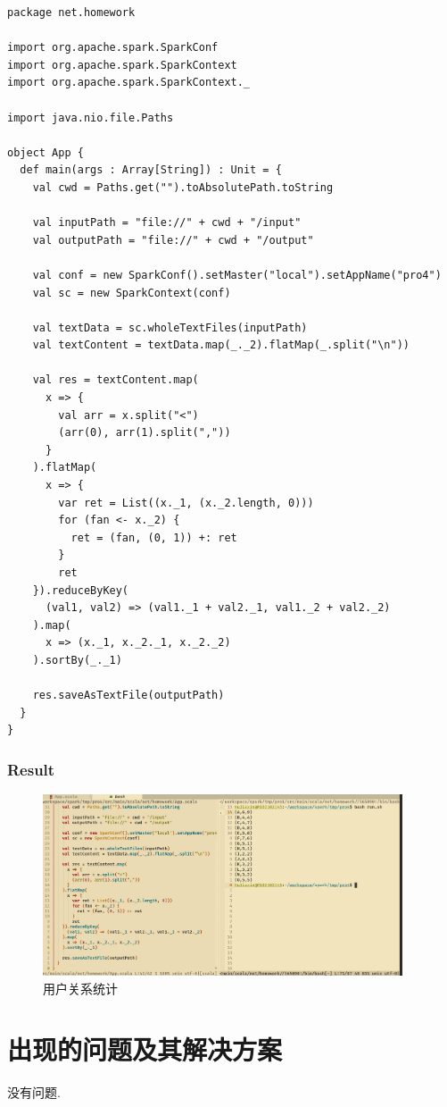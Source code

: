 \documentclass{article}
\begin{document}
\begin{center}
\begin{verbatim}
package net.homework

import org.apache.spark.SparkConf
import org.apache.spark.SparkContext
import org.apache.spark.SparkContext._

import java.nio.file.Paths

object App {
  def main(args : Array[String]) : Unit = {
    val cwd = Paths.get("").toAbsolutePath.toString

    val inputPath = "file://" + cwd + "/input"
    val outputPath = "file://" + cwd + "/output"

    val conf = new SparkConf().setMaster("local").setAppName("pro4")
    val sc = new SparkContext(conf)

    val textData = sc.wholeTextFiles(inputPath)
    val textContent = textData.map(_._2).flatMap(_.split("\n"))

    val res = textContent.map(
      x => {
        val arr = x.split("<")
        (arr(0), arr(1).split(","))
      }
    ).flatMap(
      x => {
        var ret = List((x._1, (x._2.length, 0)))
        for (fan <- x._2) {
          ret = (fan, (0, 1)) +: ret
        }
        ret
    }).reduceByKey(
      (val1, val2) => (val1._1 + val2._1, val1._2 + val2._2)
    ).map(
      x => (x._1, x._2._1, x._2._2)
    ).sortBy(_._1)

    res.saveAsTextFile(outputPath)
  }
}
\end{verbatim}
\end{center}

    \subsubsection{Result}

    \begin{figure}[H]
      \begin{center}
        \includegraphics[width=0.95\textwidth]{./figures/4.jpg}
      \end{center}
      \caption{用户关系统计}
    \end{figure}

    \section{出现的问题及其解决方案}
    没有问题.
\end{document}
